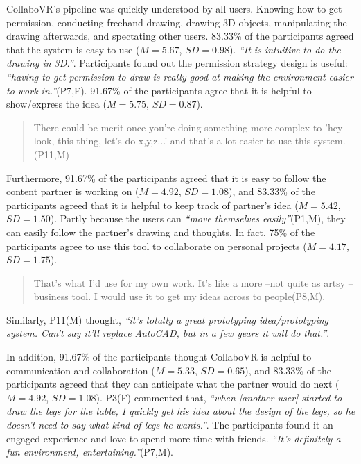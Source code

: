 \documentclass{sigchi}
\begin{document}
CollaboVR's pipeline was quickly understood by all users. Knowing how to get permission, conducting freehand drawing, drawing 3D objects, manipulating the drawing afterwards, and spectating other users. 83.33\% of the participants agreed that the system is easy to use ($M=5.67$, $SD=0.98$). \textit{``It is intuitive to do the drawing in 3D.''}. Participants found out the permission strategy design is useful: \textit{``having to get permission to draw is really good at making the environment easier to work in.''}(P7,F).
91.67\% of the participants agree that it is helpful to show/express the idea ($M=5.75$, $SD=0.87$). 
\begin{quote}
    There could be merit once you're doing something more complex to 'hey look, this thing, let's do x,y,z...' and that's a lot easier to use this system.(P11,M)    
\end{quote}
Furthermore, 91.67\% of the participants agreed that it is easy to follow the content partner is working on ($M=4.92$, $SD=1.08$), and 83.33\% of the participants agreed that it is helpful to keep track of partner's idea ($M=5.42$, $SD=1.50$). Partly because the users can \textit{``move themselves easily''}(P1,M), they can easily follow the partner's drawing and thoughts.
In fact, 75\% of the participants agree to use this tool to collaborate on personal projects ($M=4.17$, $SD=1.75$). 
\begin{quote}
    That's what I'd use for my own work. It's like a more --not quite as artsy -- business tool. I would use it to get my ideas across to people(P8,M).
\end{quote}
Similarly, P11(M) thought, \textit{``it's totally a great prototyping idea/prototyping system. Can't say it'll replace AutoCAD, but in a few years it will do that.''}.

In addition, 91.67\% of the participants thought CollaboVR is helpful to communication and collaboration ($M=5.33$, $SD=0.65$), and 83.33\% of the participants agreed that they can anticipate what the partner would do next ($M=4.92$, $SD=1.08$). P3(F) commented that, \textit{``when [another user] started to draw the legs for the table, I quickly get his idea about the design of the legs, so he doesn't need to say what kind of legs he wants.''}. The participants found it an engaged experience and love to spend more time with friends. \textit{``It's definitely a fun environment, entertaining.''}(P7,M).
\end{document}
